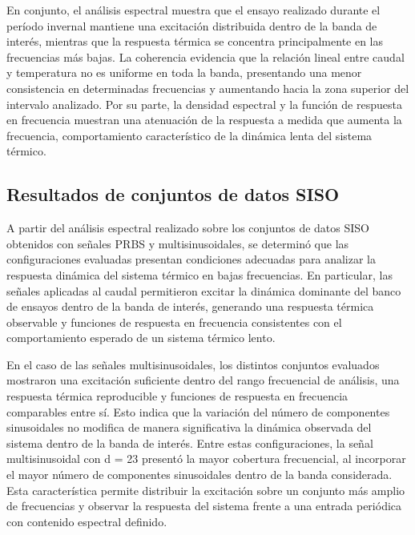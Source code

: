 \documentclass[11pt]{report}
\begin{document}
En conjunto, el análisis espectral muestra que el ensayo realizado durante el período invernal mantiene una excitación distribuida dentro de la banda de interés, mientras que la respuesta térmica se concentra principalmente en las frecuencias más bajas. La coherencia evidencia que la relación lineal entre caudal y temperatura no es uniforme en toda la banda, presentando una menor consistencia en determinadas frecuencias y aumentando hacia la zona superior del intervalo analizado. Por su parte, la densidad espectral y la función de respuesta en frecuencia muestran una atenuación de la respuesta a medida que aumenta la frecuencia, comportamiento característico de la dinámica lenta del sistema térmico. %



\subsection{Resultados de conjuntos de datos SISO}
A partir del análisis espectral realizado sobre los conjuntos de datos SISO obtenidos con señales PRBS y multisinusoidales, se determinó que las configuraciones evaluadas presentan condiciones adecuadas para analizar la respuesta dinámica del sistema térmico en bajas frecuencias. En particular, las señales aplicadas al caudal permitieron excitar la dinámica dominante del banco de ensayos dentro de la banda de interés, generando una respuesta térmica observable y funciones de respuesta en frecuencia consistentes con el comportamiento esperado de un sistema térmico lento.

En el caso de las señales multisinusoidales, los distintos conjuntos evaluados mostraron una excitación suficiente dentro del rango frecuencial de análisis, una respuesta térmica reproducible y funciones de respuesta en frecuencia comparables entre sí. Esto indica que la variación del número de componentes sinusoidales no modifica de manera significativa la dinámica observada del sistema dentro de la banda de interés. Entre estas configuraciones, la señal multisinusoidal con d = 23 presentó la mayor cobertura frecuencial, al incorporar el mayor número de componentes sinusoidales dentro de la banda considerada. Esta característica permite distribuir la excitación sobre un conjunto más amplio de frecuencias y observar la respuesta del sistema frente a una entrada periódica con contenido espectral definido.
\end{document}
